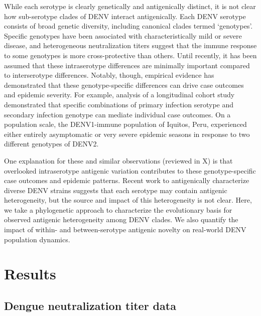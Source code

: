 \documentclass[11pt,oneside,letterpaper]{article}
\begin{document}
While each serotype is clearly genetically and antigenically distinct, it is not clear how sub-serotype clades of DENV interact antigenically.
Each DENV serotype consists of broad genetic diversity, including canonical clades termed `genotypes'.
Specific genotypes have been associated with characteristically mild or severe disease, and heterogeneous neutralization titers suggest that the immune response to some genotypes is more cross-protective than others.
Until recently, it has been assumed that these intraserotype differences are minimally important compared to interserotype differences.
Notably, though, empirical evidence has demonstrated that these genotype-specific differences can drive case outcomes and epidemic severity.
For example, analysis of a longitudinal cohort study demonstrated that specific combinations of primary infection serotype and secondary infection genotype can mediate individual case outcomes.
On a population scale, the DENV1-immune population of Iquitos, Peru, experienced either entirely asymptomatic or very severe epidemic seasons in response to two different genotypes of DENV2.

One explanation for these and similar observations (reviewed in X) is that overlooked intraserotype antigenic variation contributes to these genotype-specific case outcomes and epidemic patterns.
Recent work to antigenically characterize diverse DENV strains suggests that each serotype may contain antigenic heterogeneity, but the source and impact of this heterogeneity is not clear.
Here, we take a phylogenetic approach to characterize the evolutionary basis for observed antigenic heterogeneity among DENV clades.
We also quantify the impact of within- and between-serotype antigenic novelty on real-world DENV population dynamics.

\section*{Results}


\subsection{Dengue neutralization titer data}
\end{document}
